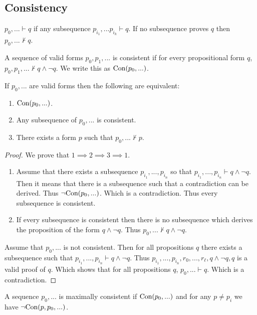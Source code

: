 \subsection{Consistency}
\begin{notation}
  $p_0,... \vdash q$ if any subsequence $p_{i_1},...p_{i_k} \vdash q$. If no subsequence proves $q$ then $p_0,... \nvdash q$.
\end{notation}
\begin{definition}
  A sequence of valid forms $p_0,p_1,...$ is consistent if for every propositional form $q$, $p_0,p_1,... \nvdash q\land \lnot q$. We write this as $\text{Con}(p_0,...)$.
\end{definition}
\begin{theorem}
  If $p_0,...$ are valid forms then the following are equivalent:
  \begin{enumerate}
    \item $\text{Con}(p_0,...)$.
    \item Any subsequence of $p_0,...$ is consistent.
    \item There exists a form $p$ such that $p_0,...\nvdash p$.
  \end{enumerate}
\end{theorem}
\begin{proof}
  We prove that $1\implies 2 \implies 3 \implies 1$.
  \begin{enumerate}
    \item Assume that there exists a subsequence $p_{i_1},...,p_{i_n}$ so that $p_{i_1},...,p_{i_n}\vdash q\land \lnot q$. Then it means that there is a subsequence such that a contradiction can be derived. Thus $\lnot \text{Con}(p_0,...)$. Which is a contradiction. Thus every subsequence is consistent.
    \item If every subsequence is consistent then there is no subsequence which derives the proposition of the form $q\land \lnot q$. Thus $p_0,... \nvdash q\land \lnot q$.
  \end{enumerate}
\item Assume that $p_0,...$ is not consistent. Then for all propositions $q$ there exists a subsequence such that $p_{i_1},...,p_{i_n} \vdash q\land \lnot q$. Thus $p_{i_1},...,p_{i_n}, r_0,...,r_\ell, q\land \lnot q, q$ is a valid proof of $q$. Which shows that for all propositions $q$, $p_0,... \vdash q$. Which is a contradiction.
\end{proof}
\begin{definition}
  A sequence $p_0,...$ is maximally consistent if $\text{Con}(p_0,...)$ and for any $p \neq p_i$ we have $\lnot \text{Con}(p,p_0,...)$.
\end{definition}
